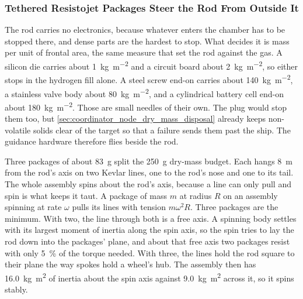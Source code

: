\documentclass{article}
\begin{document}
\subsubsection{Tethered Resistojet Packages Steer the Rod From Outside It}\label{sec:tethered_rod_packages}

The rod carries no electronics, because whatever enters the chamber has to be stopped there, and dense parts are the hardest to stop. What decides it is mass per unit of frontal area, the same measure that set the rod against the gas. A silicon die carries about \SI{1}{\kilogram\per\square\meter} and a circuit board about \SI{2}{\kilogram\per\square\meter}, so either stops in the hydrogen fill alone. A steel screw end-on carries about \SI{140}{\kilogram\per\square\meter}, a stainless valve body about \SI{80}{\kilogram\per\square\meter}, and a cylindrical battery cell end-on about \SI{180}{\kilogram\per\square\meter}. Those are small needles of their own. The plug would stop them too, but \autoref{sec:coordinator_node_dry_mass_disposal} already keeps non-volatile solids clear of the target so that a failure sends them past the ship. The guidance hardware therefore flies beside the rod.

Three packages of about \SI{83}{\gram} split the \SI{250}{\gram} dry-mass budget. Each hangs \SI{8}{\meter} from the rod's axis on two Kevlar lines, one to the rod's nose and one to its tail. The whole assembly spins about the rod's axis, because a line can only pull and spin is what keeps it taut. A package of mass $m$ at radius $R$ on an assembly spinning at rate $\omega$ pulls its lines with tension $m\omega^2R$. Three packages are the minimum. With two, the line through both is a free axis. A spinning body settles with its largest moment of inertia along the spin axis, so the spin tries to lay the rod down into the packages' plane, and about that free axis two packages resist with only \SI{5}{\percent} of the torque needed. With three, the lines hold the rod square to their plane the way spokes hold a wheel's hub. The assembly then has \SI{16.0}{\kilogram\meter\squared} of inertia about the spin axis against \SI{9.0}{\kilogram\meter\squared} across it, so it spins stably.
\end{document}
